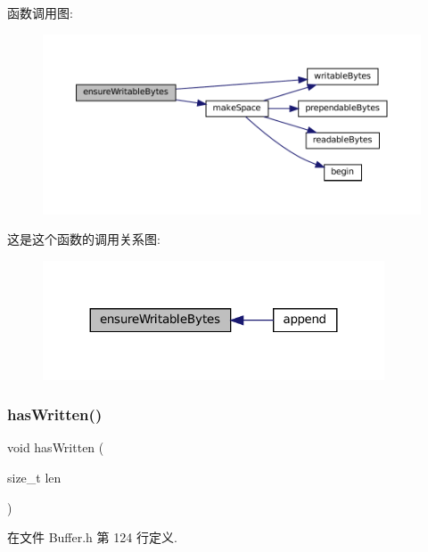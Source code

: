 函数调用图\+:
\nopagebreak
\begin{figure}[H]
\begin{center}
\leavevmode
\includegraphics[width=350pt]{classmuduo_1_1Buffer_a1185aa5bbe069f50c8d46a9f8d5aac32_cgraph}
\end{center}
\end{figure}
这是这个函数的调用关系图\+:
\nopagebreak
\begin{figure}[H]
\begin{center}
\leavevmode
\includegraphics[width=287pt]{classmuduo_1_1Buffer_a1185aa5bbe069f50c8d46a9f8d5aac32_icgraph}
\end{center}
\end{figure}
\mbox{\label{classmuduo_1_1Buffer_ae29d7ca8954d0ec7da6363221c80a245}} 
\subsubsection{\texorpdfstring{has\+Written()}{hasWritten()}}
{\footnotesize\ttfamily void has\+Written (\begin{DoxyParamCaption}\item[{size\+\_\+t}]{len }\end{DoxyParamCaption})\hspace{0.3cm}{\ttfamily [inline]}}



在文件 Buffer.\+h 第 124 行定义.



